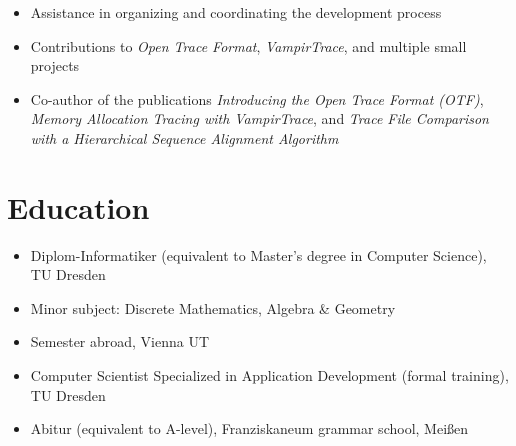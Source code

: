 \begin{itemize}
\begin{itemize}
			\item Assistance in organizing and coordinating the development process
			\item Contributions to \emph{Open Trace Format}, \emph{VampirTrace}, and multiple small projects
			\item Co-author of the publications \emph{Introducing the Open Trace Format (OTF)},
			\emph{Memory Allocation Tracing with VampirTrace}, and \emph{Trace File Comparison with a Hierarchical Sequence Alignment Algorithm}
		\end{itemize}
\end{itemize}

\customhrule
\section*{Education}
\begin{itemize}
	\item {}
		Diplom-Informatiker (equivalent to Master's degree in Computer Science), TU Dresden
	\item \hspace{1em} Minor subject: Discrete Mathematics, Algebra \& Geometry
	\item {}
		Semester abroad, Vienna UT
	\item {}
		Computer Scientist Specialized in Application Development (formal training), TU Dresden
	\item {}
		Abitur (equivalent to A-level), Franziskaneum grammar school, Mei\ss en %
\end{itemize}

\customhrule
